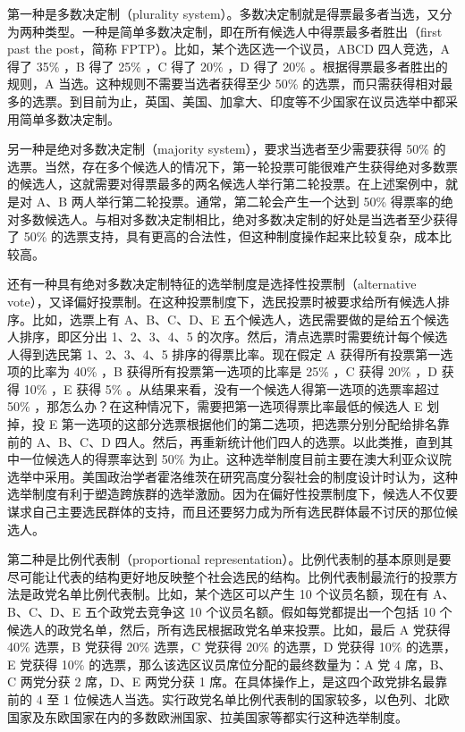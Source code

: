 第一种是多数决定制（plurality system）。多数决定制就是得票最多者当选，又分为两种类型。一种是简单多数决定制，即在所有候选人中得票最多者胜出（first past the post，简称 FPTP）。比如，某个选区选一个议员，ABCD 四人竞选，A 得了 35\% ，B 得了 25\% ，C 得了 20\% ，D 得了 20\% 。根据得票最多者胜出的规则，A 当选。这种规则不需要当选者获得至少 50\% 的选票，而只需获得相对最多的选票。到目前为止，英国、美国、加拿大、印度等不少国家在议员选举中都采用简单多数决定制。

另一种是绝对多数决定制（majority system），要求当选者至少需要获得 50\% 的选票。当然，存在多个候选人的情况下，第一轮投票可能很难产生获得绝对多数票的候选人，这就需要对得票最多的两名候选人举行第二轮投票。在上述案例中，就是对 A、B 两人举行第二轮投票。通常，第二轮会产生一个达到 50\% 得票率的绝对多数候选人。与相对多数决定制相比，绝对多数决定制的好处是当选者至少获得了 50\% 的选票支持，具有更高的合法性，但这种制度操作起来比较复杂，成本比较高。

还有一种具有绝对多数决定制特征的选举制度是选择性投票制（alternative vote），又译偏好投票制。在这种投票制度下，选民投票时被要求给所有候选人排序。比如，选票上有 A、B、C、D、E 五个候选人，选民需要做的是给五个候选人排序，即区分出 1、2、3、4、5 的次序。然后，清点选票时需要统计每个候选人得到选民第 1、2、3、4、5 排序的得票比率。现在假定 A 获得所有投票第一选项的比率为 40\% ，B 获得所有投票第一选项的比率是 25\% ，C 获得 20\% ，D 获得 10\% ，E 获得 5\% 。从结果来看，没有一个候选人得第一选项的选票率超过 50\% ，那怎么办？在这种情况下，需要把第一选项得票比率最低的候选人 E 划掉，投 E 第一选项的这部分选票根据他们的第二选项，把选票分别分配给排名靠前的 A、B、C、D 四人。然后，再重新统计他们四人的选票。以此类推，直到其中一位候选人的得票率达到 50\% 为止。这种选举制度目前主要在澳大利亚众议院选举中采用。美国政治学者霍洛维茨在研究高度分裂社会的制度设计时认为，这种选举制度有利于塑造跨族群的选举激励。因为在偏好性投票制度下，候选人不仅要谋求自己主要选民群体的支持，而且还要努力成为所有选民群体最不讨厌的那位候选人。

第二种是比例代表制（proportional representation）。比例代表制的基本原则是要尽可能让代表的结构更好地反映整个社会选民的结构。比例代表制最流行的投票方法是政党名单比例代表制。比如，某个选区可以产生 10 个议员名额，现在有 A、B、C、D、E 五个政党去竞争这 10 个议员名额。假如每党都提出一个包括 10 个候选人的政党名单，然后，所有选民根据政党名单来投票。比如，最后 A 党获得 40\% 选票，B 党获得 20\% 选票，C 党获得 20\% 的选票，D 党获得 10\% 的选票，E 党获得 10\% 的选票，那么该选区议员席位分配的最终数量为：A 党 4 席，B、C 两党分获 2 席，D、E 两党分获 1 席。在具体操作上，是这四个政党排名最靠前的 4 至 1 位候选人当选。实行政党名单比例代表制的国家较多，以色列、北欧国家及东欧国家在内的多数欧洲国家、拉美国家等都实行这种选举制度。


